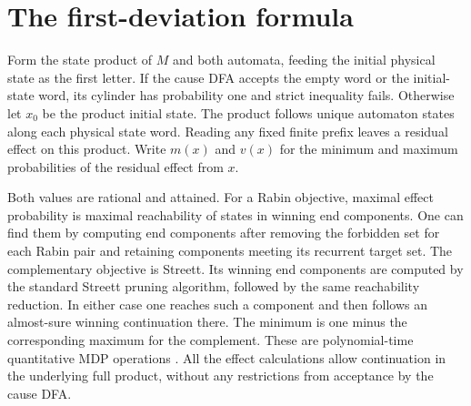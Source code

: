 \documentclass[11pt,a4paper]{amsart}
\begin{document}
\section{The first-deviation formula}
Form the state product of $M$ and both automata, feeding the initial physical state as the first letter. If the cause DFA accepts the empty word or the initial-state word, its cylinder has probability one and strict inequality fails. Otherwise let $x_0$ be the product initial state. The product follows unique automaton states along each physical state word. Reading any fixed finite prefix leaves a residual effect on this product. Write $m(x)$ and $v(x)$ for the minimum and maximum probabilities of the residual effect from $x$.

Both values are rational and attained. For a Rabin objective, maximal effect probability is maximal reachability of states in winning end components. One can find them by computing end components after removing the forbidden set for each Rabin pair and retaining components meeting its recurrent target set. The complementary objective is Streett. Its winning end components are computed by the standard Streett pruning algorithm, followed by the same reachability reduction. In either case one reaches such a component and then follows an almost-sure winning continuation there. The minimum is one minus the corresponding maximum for the complement. These are polynomial-time quantitative MDP operations \cite[Theorems~11--12 and 14--15]{chatterjee}. All the effect calculations allow continuation in the underlying full product, without any restrictions from acceptance by the cause DFA.
\end{document}
